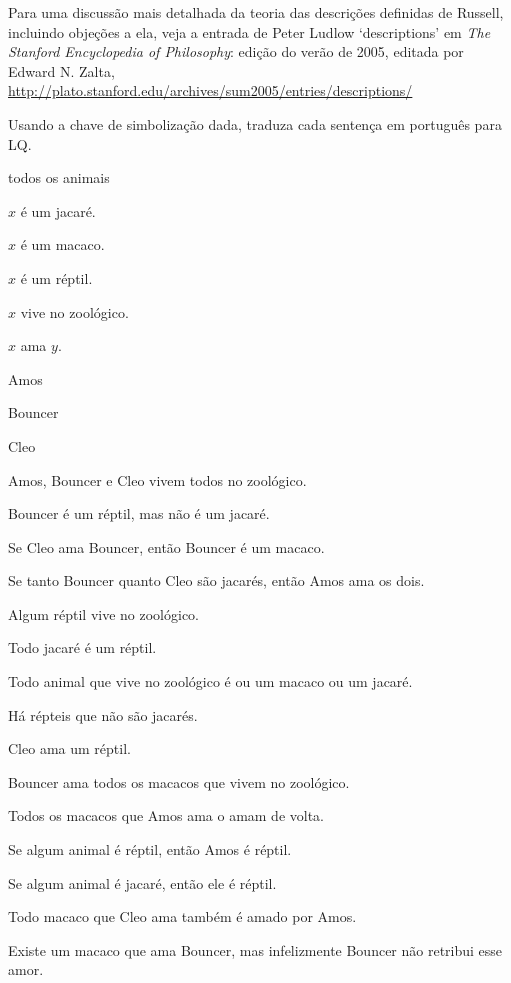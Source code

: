Para uma discussão mais detalhada da teoria das descrições definidas de Russell, incluindo objeções a ela, veja a entrada de Peter Ludlow `descriptions' em \emph{The Stanford Encyclopedia of Philosophy}: edição do verão de 2005, editada por Edward N. Zalta, \url{http://plato.stanford.edu/archives/sum2005/entries/descriptions/}



\practiceproblems

\solutions
\problempart
\label{pr.QLalligators}
Usando a chave de simbolização dada, traduza cada sentença em português para LQ.
\begin{ekey}
\item[UD:] todos os animais
\item[Ax:] $x$ é um jacaré.
\item[Mx:] $x$ é um macaco.
\item[Rx:] $x$ é um réptil.
\item[Zx:] $x$ vive no zoológico.
\item[Lxy:] $x$ ama $y$.
\item[a:] Amos
\item[b:] Bouncer
\item[c:] Cleo
\end{ekey}
\begin{earg}
\item Amos, Bouncer e Cleo vivem todos no zoológico. 
\item Bouncer é um réptil, mas não é um jacaré. 
\item Se Cleo ama Bouncer, então Bouncer é um macaco. 
\item Se tanto Bouncer quanto Cleo são jacarés, então Amos ama os dois.
\item Algum réptil vive no zoológico. 
\item Todo jacaré é um réptil. 
\item Todo animal que vive no zoológico é ou um macaco ou um jacaré. 
\item Há répteis que não são jacarés.
\item Cleo ama um réptil.
\item Bouncer ama todos os macacos que vivem no zoológico.
\item Todos os macacos que Amos ama o amam de volta.
\item Se algum animal é réptil, então Amos é réptil.
\item Se algum animal é jacaré, então ele é réptil.
\item Todo macaco que Cleo ama também é amado por Amos.
\item Existe um macaco que ama Bouncer, mas infelizmente Bouncer não retribui esse amor.
\end{earg}



